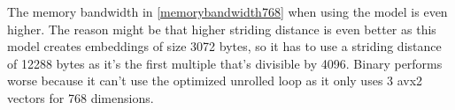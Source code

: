 \noindent The memory bandwidth in \autoref{memorybandwidth768} when using the \texttt{} model is even higher. The reason might be that higher striding distance is even better as this model creates embeddings of size 3072 bytes, so it has to use a striding distance of 12288 bytes as it's the first multiple that's divisible by 4096. Binary performs worse because it can't use the optimized unrolled loop as it only uses 3 avx2 vectors for 768 dimensions.

\begin{figure}[h]
\end{figure}
